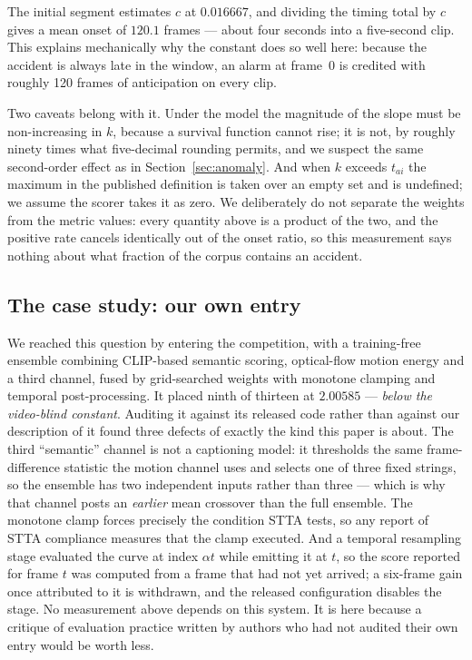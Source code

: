 The initial segment estimates $c$ at $0.016667$, and dividing the timing total
by $c$ gives a mean onset of $120.1$ frames --- about four seconds into a
five-second clip. This explains mechanically why the constant does so well
here: because the accident is always late in the window, an alarm at frame~0 is
credited with roughly 120 frames of anticipation on every clip.

Two caveats belong with it. Under the model the magnitude of the slope must be
non-increasing in $k$, because a survival function cannot rise; it is not, by
roughly ninety times what five-decimal rounding permits, and we suspect the
same second-order effect as in Section~\ref{sec:anomaly}. And when $k$ exceeds
$t_{ai}$ the maximum in the published definition is taken over an empty set and
is undefined; we assume the scorer takes it as zero. We deliberately do not
separate the weights from the metric values: every quantity above is a product
of the two, and the positive rate cancels identically out of the onset ratio,
so this measurement says nothing about what fraction of the corpus contains an
accident.

\subsection{The case study: our own entry}
\label{sec:casestudy}

We reached this question by entering the competition, with a training-free
ensemble combining CLIP-based semantic scoring, optical-flow motion energy and
a third channel, fused by grid-searched weights with monotone clamping and
temporal post-processing. It placed ninth of thirteen at $2.00585$ ---
\emph{below the video-blind constant}. Auditing it against its released code
rather than against our description of it found three defects of exactly the
kind this paper is about. The third ``semantic'' channel is not a captioning
model: it thresholds the same frame-difference statistic the motion channel
uses and selects one of three fixed strings, so the ensemble has two
independent inputs rather than three --- which is why that channel posts an
\emph{earlier} mean crossover than the full ensemble. The monotone clamp forces
precisely the condition STTA tests, so any report of STTA compliance measures
that the clamp executed. And a temporal resampling stage evaluated the curve at
index $\alpha t$ while emitting it at $t$, so the score reported for frame $t$
was computed from a frame that had not yet arrived; a six-frame gain once
attributed to it is withdrawn, and the released configuration disables the
stage. No measurement above depends on this system. It is here because a
critique of evaluation practice written by authors who had not audited their
own entry would be worth less.
